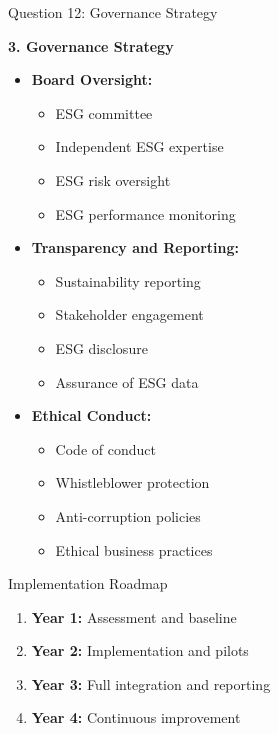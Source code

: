 \documentclass[aspectratio=169]{beamer}
\newcommand{\subquestion}[1]{{\bfseries\color{darkgreen}#1}}
\begin{document}
	\begin{frame}{Question 12: Governance Strategy}
		
		\subquestion{3. Governance Strategy}
		\begin{itemize}
			\item \textbf{Board Oversight:}
			\begin{itemize}
				\item ESG committee
				\item Independent ESG expertise
				\item ESG risk oversight
				\item ESG performance monitoring
			\end{itemize}
			\item \textbf{Transparency and Reporting:}
			\begin{itemize}
				\item Sustainability reporting
				\item Stakeholder engagement
				\item ESG disclosure
				\item Assurance of ESG data
			\end{itemize}
			\item \textbf{Ethical Conduct:}
			\begin{itemize}
				\item Code of conduct
				\item Whistleblower protection
				\item Anti-corruption policies
				\item Ethical business practices
			\end{itemize}
		\end{itemize}
		
		\begin{block}{Implementation Roadmap}
			\begin{enumerate}
				\item \textbf{Year 1:} Assessment and baseline
				\item \textbf{Year 2:} Implementation and pilots
				\item \textbf{Year 3:} Full integration and reporting
				\item \textbf{Year 4:} Continuous improvement
			\end{enumerate}
		\end{block}
	\end{frame}
	
\end{document}

